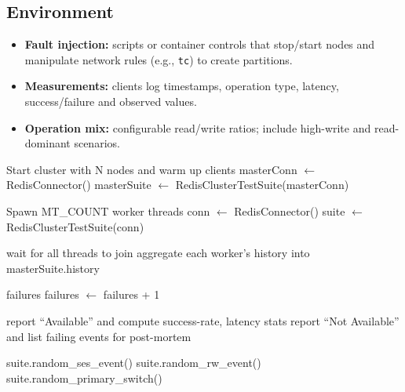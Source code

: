 \documentclass{article}
\begin{document}
\subsection{Environment}
\begin{itemize}
    \item \textbf{Fault injection:} scripts or container controls that stop/start nodes and manipulate network rules (e.g., \texttt{tc}) to create partitions.
    \item \textbf{Measurements:} clients log timestamps, operation type, latency, success/failure and observed values.
    \item \textbf{Operation mix:} configurable read/write ratios; include high-write and read-dominant scenarios.
\end{itemize}

\begin{algorithm}
\caption{Availability Test (detailed)}
\begin{algorithmic}[1]
    \State Start cluster with N nodes and warm up clients
    \State masterConn $\gets$ RedisConnector()
    \State masterSuite $\gets$ RedisClusterTestSuite(masterConn)

    \State Spawn MT\_COUNT worker threads
        \State conn $\gets$ RedisConnector()
        \State suite $\gets$ RedisClusterTestSuite(conn)
        \State {}
    \EndFor

    \State wait for all threads to join
    \State aggregate each worker's history into masterSuite.history

    \State {}
    \State failures 
            \State failures $\gets$ failures + 1
        \EndIf
    \EndFor

        \State report ``Available'' and compute success-rate, latency stats
    \Else
        \State report ``Not Available'' and list failing events for post-mortem
    \EndIf
\EndProcedure

        \State suite.random\_ses\_event() 
        \State suite.random\_rw\_event() 
        \State suite.random\_primary\_switch() 
        \State {}
    \EndFor
    \State {}
\EndProcedure
\end{algorithmic}
\end{algorithm}
\end{document}
